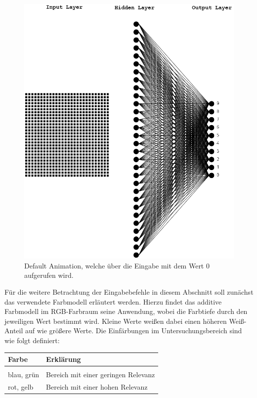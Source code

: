 \begin{figure}[!hbt]
	\centering
	\includegraphics[scale=0.75]{Bilder/animation_network_default}
	\caption{Default Animation, welche über die Eingabe mit dem Wert $0$ aufgerufen wird.} 
	\label{fig:animation_network_default} 
\end{figure}
 
\noindent
Für die weitere Betrachtung der Eingabebefehle in diesem Abschnitt soll zunächst das verwendete Farbmodell erläutert werden. Hierzu findet das additive Farbmodell im RGB-Farbraum seine Anwendung, wobei die Farbtiefe durch den jeweiligen Wert bestimmt wird. Kleine Werte weißen dabei einen höheren Weiß-Anteil auf wie größere Werte. Die Einfärbungen im Untersuchungsbereich sind wie folgt definiert:
\begin{center}
\begin{tabular}{lp{6cm}}
\textbf{Farbe}   & \textbf{Erklärung} \\
\hline \\
blau, grün & Bereich mit einer geringen Relevanz \\[0.2cm]
rot, gelb  & Bereich mit einer hohen Relevanz   \\
\end{tabular}
\end{center} 
\vspace{1cm}

